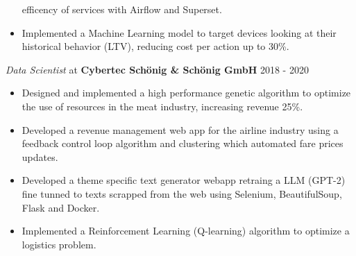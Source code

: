 \documentclass[margin]{res}
\begin{document}
\begin{resume}
\begin{itemize}
            efficency of services with Airflow and Superset.
        \item Implemented a Machine Learning model to target devices looking at their
            historical behavior (LTV), reducing cost per action up to 30\%.
    \end{itemize}
    {\sl Data Scientist} at {\bf Cybertec Sch\"onig \& Sch\"onig GmbH} \hfill 2018 - 2020
    \begin{itemize}  \itemsep -2pt %
        \item Designed and implemented a high performance genetic 
            algorithm to optimize the use of resources in the meat industry, increasing revenue 25\%.
        \item Developed a revenue management web app for the airline industry 
            using a feedback control loop algorithm and clustering which automated fare prices updates.
         \item Developed a theme specific text generator webapp retraing a LLM (GPT-2) fine tunned to 
             texts scrapped from the web using Selenium, BeautifulSoup, Flask and Docker.
        \item Implemented a Reinforcement Learning (Q-learning) algorithm 
            to optimize a logistics problem.
    \end{itemize}
		


\end{resume}
\end{document}
